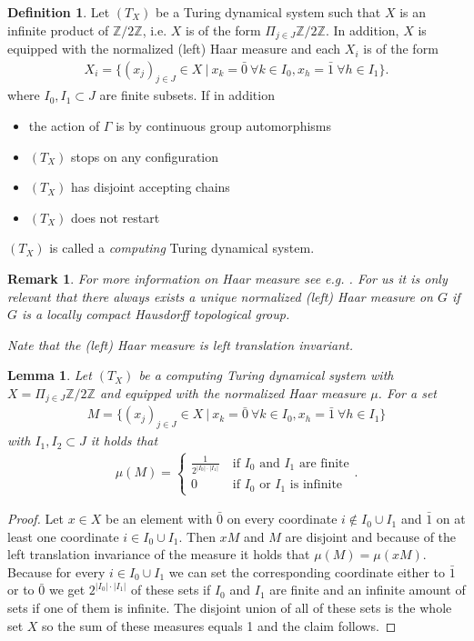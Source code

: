 \documentclass[12pt,a4paper]{scrartcl}
\theoremstyle{plain}
\newtheorem{Lemma}[Theorem]{Lemma}
\newtheorem{Remark}[Theorem]{Remark}
\theoremstyle{definition}
\newtheorem{Definition}[Theorem]{Definition}
\numberwithin{equation}{section}
\newcommand{\2}{\mathbb{Z} / 2 \mathbb{Z}}
\newcommand{\1}{\bar{1}}
\newcommand{\0}{\bar{0}}
\begin{document}
\begin{Definition}
	Let $(T_X)$ be a Turing dynamical system such that $X$ is an infinite product of $\2$, i.e. $X$ is of the form $ \Pi_{j \in J} \2$. In addition, $X$ is equipped with the normalized (left) Haar measure and each $X_i$ is of the form 
	\begin{align*}
		X_i = \{(x_j)_{j \in J} \in X \ | \ x_k = \0 \ \forall k \in I_0, x_h = \1 \ \forall h \in I_1\}.
	\end{align*}
	where $I_0, I_1 \subset J$ are finite subsets.
	If in addition
	\begin{itemize}
		\item the action of $\Gamma$ is by continuous group automorphisms
		\item $(T_X)$ stops on any configuration
		\item $(T_X)$ has disjoint accepting chains
		\item $(T_X)$ does not restart
	\end{itemize}
	$(T_X)$ is called a \emph{computing} Turing dynamical system.
\end{Definition}
\begin{Remark}
	For more information on Haar measure see e.g. . For us it is only relevant that there always exists a unique normalized (left) Haar measure on $G$ if $G$ is a locally compact Hausdorff topological group.
	
	Nate that the (left) Haar measure is left translation invariant.
\end{Remark}
\begin{Lemma}
	Let $(T_X)$ be a computing Turing dynamical system with $X = \Pi_{j \in J} \2$ and equipped with the normalized Haar measure $\mu$. For a set 
	\begin{align*}
		M = \{(x_j)_{j \in J} \in X \ | \ x_k = \0 \ \forall k \in I_0, x_h = \1 \ \forall h \in I_1 \}
	\end{align*}
	with $I_1, I_2 \subset J$ it holds that
	\begin{align*}
	\mu (M) = \begin{cases}
	\frac{1}{2^{|I_0| \cdot |I_1|}} & ~\text{if $I_0$ and $I_1$ are finite} \\
	0 & ~ \text{if $I_0$ or $I_1$ is infinite}
	\end{cases}.
	\end{align*}
\end{Lemma}
\begin{proof}
	Let $x \in X$ be an element with $\0$ on every coordinate $i \notin I_0 \cup I_1$ and $\1$ on at least one coordinate $i \in I_0 \cup I_1$. Then $xM$ and $M$ are disjoint and because of the left translation invariance of the measure it holds that $\mu (M) = \mu (xM)$. Because for every $i \in I_0 \cup I_1$ we can set the corresponding coordinate either to $\1$ or to $\0$ we get $2^{|I_0| \cdot |I_1|}$ of these sets if $I_0$ and $I_1$ are finite and an infinite amount of sets if one of them is infinite. The disjoint union of all of these sets is the whole set $X$ so the sum of these measures equals 1 and the claim follows.
\end{proof}
 
\end{document}
